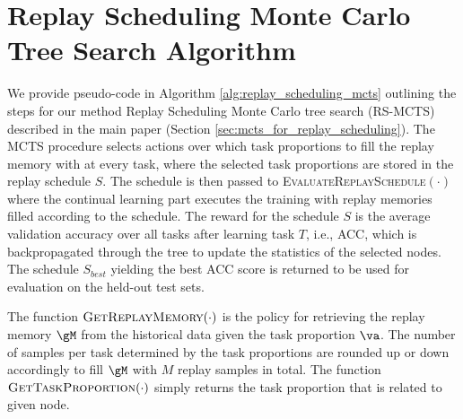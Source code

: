 

\section{Replay Scheduling Monte Carlo Tree Search Algorithm}\label{app:rs_mcts_algorithm}

%


We provide pseudo-code in Algorithm \ref{alg:replay_scheduling_mcts} outlining the steps for our method Replay Scheduling Monte Carlo tree search (RS-MCTS) described in the main paper (Section \ref{sec:mcts_for_replay_scheduling}). The MCTS procedure selects actions over which task proportions to fill the replay memory with at every task, where the selected task proportions are stored in the replay schedule $S$. The schedule is then passed to \textsc{EvaluateReplaySchedule$(\cdot)$} where the continual learning part executes the training with replay memories filled according to the schedule. The reward for the schedule $S$ is the average validation accuracy over all tasks after learning task $T$, i.e., ACC, which is backpropagated through the tree to update the statistics of the selected nodes. The schedule $S_{best}$ yielding the best ACC score is returned to be used for evaluation on the held-out test sets.

The function $\textsc{GetReplayMemory}(\cdot)$ is the policy for retrieving the replay memory $\gM$ from the historical data given the task proportion $\va$. The number of samples per task determined by the task proportions are rounded up or down accordingly to fill $\gM$ with $M$ replay samples in total. 
The function $\textsc{GetTaskProportion}(\cdot)$ simply returns the task proportion that is related to given node.



